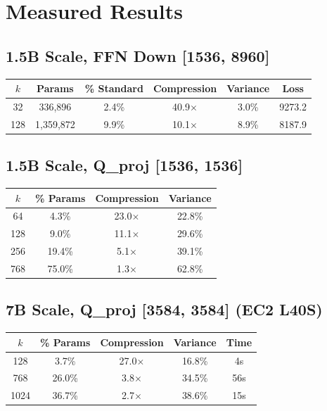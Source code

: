 \documentclass[11pt]{article}
\begin{document}
\section{Measured Results}

\subsection{1.5B Scale, FFN Down [1536, 8960]}
\begin{table}[h]\centering
\begin{tabular}{cccccc}\toprule
$k$ & Params & \% Standard & Compression & Variance & Loss \\\midrule
32 & 336,896 & 2.4\% & 40.9$\times$ & 3.0\% & 9273.2 \\
128 & 1,359,872 & 9.9\% & 10.1$\times$ & 8.9\% & 8187.9 \\\bottomrule
\end{tabular}\end{table}

\subsection{1.5B Scale, Q\_proj [1536, 1536]}
\begin{table}[h]\centering
\begin{tabular}{cccc}\toprule
$k$ & \% Params & Compression & Variance \\\midrule
64 & 4.3\% & 23.0$\times$ & 22.8\% \\
128 & 9.0\% & 11.1$\times$ & 29.6\% \\
256 & 19.4\% & 5.1$\times$ & 39.1\% \\
768 & 75.0\% & 1.3$\times$ & 62.8\% \\\bottomrule
\end{tabular}\end{table}

\subsection{7B Scale, Q\_proj [3584, 3584] (EC2 L40S)}
\begin{table}[h]\centering
\begin{tabular}{ccccc}\toprule
$k$ & \% Params & Compression & Variance & Time \\\midrule
128 & 3.7\% & 27.0$\times$ & 16.8\% & 4s \\
768 & 26.0\% & 3.8$\times$ & 34.5\% & 56s \\
1024 & 36.7\% & 2.7$\times$ & 38.6\% & 15s \\\bottomrule
\end{tabular}\end{table}
\end{document}
